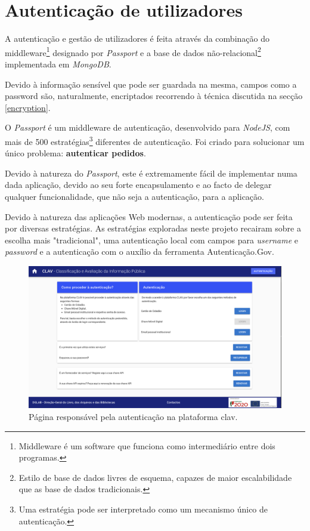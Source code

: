 \cleardoublepage
\section{Autenticação de utilizadores}
A autenticação e gestão de utilizadores é feita através da combinação do middleware\footnote{Middleware é um software que funciona como intermediário entre dois programas.} designado por \emph{Passport} e a base de dados não-relacional\footnote{Estilo de base de dados livres de esquema, capazes de maior escalabilidade que as base de dados tradicionais.} implementada em \emph{MongoDB}.

Devido à informação sensível que pode ser guardada na mesma, campos como a password são, naturalmente, encriptados recorrendo à técnica discutida na secção \ref{encryption}.

O \emph{Passport} é um middleware de autenticação, desenvolvido para \emph{NodeJS}, com mais de 500 estratégias\footnote{Uma estratégia pode ser interpretado como um mecanismo único de autenticação.} diferentes de autenticação. Foi criado para solucionar um único problema: \textbf{autenticar pedidos}.

Devido à natureza do \emph{Passport}, este é extremamente fácil de implementar numa dada aplicação, devido ao seu forte encapsulamento e ao facto de delegar qualquer funcionalidade, que não seja a autenticação, para a aplicação.

Devido à natureza das aplicações Web modernas, a autenticação pode ser feita por diversas estratégias. As estratégias exploradas neste projeto recairam sobre a escolha mais "tradicional", uma autenticação local com campos para \emph{username} e \emph{password} e a autenticação com o auxílio da ferramenta Autenticação.Gov.

\begin{figure}[h!]
    \centering
    \includegraphics[width=\textwidth]{img/clav/paginaAuth.png}
    \caption{Página responsável pela autenticação na plataforma \gls{clav}.}
    \label{fig:paginaAutenticacao}
\end{figure}

